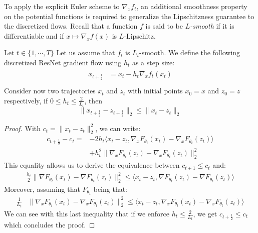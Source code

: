 To apply the explicit Euler scheme to $\nabla_x f_t$, an  additional smoothness property on the potential functions is required  to generalize the Lipschitzness guarantee to the discretized flows. Recall that a function $f$ is said to be \emph{$L$-smooth} if it is differentiable and if $x\mapsto\nabla_x f(x)$ is $L$-Lipschitz. 
\begin{prop}\label{prop:discrete_convex_potentials}
Let $t\in\{1,\cdots,T\}$ Let us assume that $f_{t}$ is $L_t$-smooth. We  define the following discretized ResNet gradient flow using $h_t$ as a step size:
\begin{align*}
    \begin{array}{ll}
    x_{t+\frac12} &= x_{t}-h_{t}\nabla_xf_{t}(x_{t})\\
  \end{array}
 \end{align*}
Consider now two trajectories $x_t$ and $z_t$ with initial points $x_0=x$ and $z_0=z$ respectively,  if $0\leq h_t\leq \frac{2}{L_t}$,  then 
$$\lVert x_{t+\frac12}-z_{t+\frac12}\rVert_2\leq \lVert x_t-z_t\rVert_2$$
\end{prop}
\begin{proof}
  With $c_t = \lVert x_t -z_t\rVert_2^2$, we can write:
  \begin{align*}
     c_{t+\frac12} - c_t = &-2 h_t \big\langle x_t - z_t, \nabla_xF_{\theta_{t}}(x_t) - \nabla_xF_{\theta_{t}}(z_t)  \big\rangle\\
     &+ h_t^2 \lVert \nabla_xF_{\theta_{t}}(z_t) - \nabla_xF_{\theta_{t}}(z_t)\rVert_2^2
  \end{align*}
  This equality allows us to derive the equivalence between  $c_{t+1} \leq c_t$ and: 
  \begin{align*}
     \frac{h_t}{2}
     \lVert  \nabla F_{\theta_{t}}(x_t) - \nabla F_{\theta_{t}}(z_t)\rVert_2^2
     \leq
     \langle x_t -z_t, \nabla F_{\theta_{t}}(z_t) - \nabla F_{\theta_{t}}(z_t) \rangle 
  \end{align*}
  Moreover, assuming that $F_{\theta_t}$ being  that:
  \begin{align*}
     \frac{1}{L_t} &\lVert \nabla_xF_{\theta_{t}}(x_t) - \nabla_xF_{\theta_{t}}(z_t)\rVert_2^2 
     \leq\big\langle x_t -z_t, \nabla_xF_{\theta_{t}}(x_t) - \nabla_xF_{\theta_{t}}(z_t) \big\rangle
  \end{align*}
  We can see with this last inequality that if we enforce  $h_t \leq \frac{2}{L_t}$, we get $c_{t+\frac12} \leq c_t$ which concludes the proof.
  \end{proof}
  


